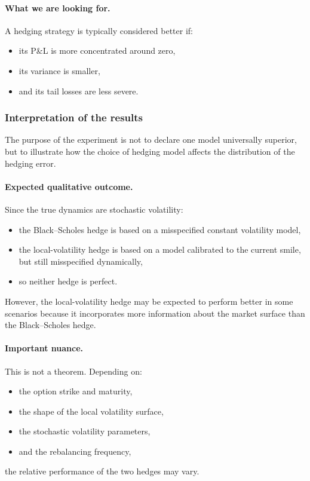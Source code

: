 \documentclass[11pt]{article}
\theoremstyle{plain}
\theoremstyle{definition}
\theoremstyle{remark}
\begin{document}
\paragraph{What we are looking for.}
A hedging strategy is typically considered better if:
\begin{itemize}[leftmargin=1.4em]
    \item its P\&L is more concentrated around zero,
    \item its variance is smaller,
    \item and its tail losses are less severe.
\end{itemize}

\subsubsection{Interpretation of the results}

The purpose of the experiment is not to declare one model universally
superior, but to illustrate how the choice of hedging model affects the
distribution of the hedging error.

\paragraph{Expected qualitative outcome.}
Since the true dynamics are stochastic volatility:
\begin{itemize}[leftmargin=1.4em]
    \item the Black--Scholes hedge is based on a misspecified constant
    volatility model,
    \item the local-volatility hedge is based on a model calibrated to
    the current smile, but still misspecified dynamically,
    \item so neither hedge is perfect.
\end{itemize}

However, the local-volatility hedge may be expected to perform better in
some scenarios because it incorporates more information about the market
surface than the Black--Scholes hedge.

\paragraph{Important nuance.}
This is not a theorem.
Depending on:
\begin{itemize}[leftmargin=1.4em]
    \item the option strike and maturity,
    \item the shape of the local volatility surface,
    \item the stochastic volatility parameters,
    \item and the rebalancing frequency,
\end{itemize}
the relative performance of the two hedges may vary.
\end{document}
